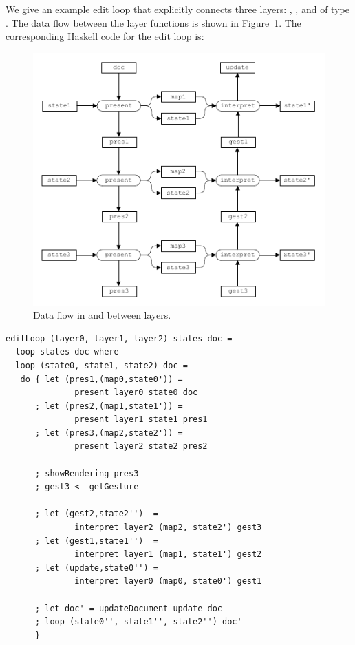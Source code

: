 \documentclass[preprint,natbib]{sigplanconf}
\begin{document}
We give an example edit loop that explicitly connects three layers: , , and  of type . The data flow between the layer functions is shown in Figure~\ref{explicit}. The corresponding Haskell code for the edit loop is:



\begin{figure}
\includegraphics[width=\columnwidth]{images/LayersDataFlow}
\caption{Data flow in and between layers.} \label{explicit} 
\end{figure}

\begin{small}
\begin{verbatim}
editLoop (layer0, layer1, layer2) states doc = 
  loop states doc where
  loop (state0, state1, state2) doc = 
   do { let (pres1,(map0,state0')) = 
              present layer0 state0 doc
      ; let (pres2,(map1,state1')) = 
              present layer1 state1 pres1
      ; let (pres3,(map2,state2')) = 
              present layer2 state2 pres2

      ; showRendering pres3
      ; gest3 <- getGesture

      ; let (gest2,state2'')  = 
              interpret layer2 (map2, state2') gest3
      ; let (gest1,state1'')  =
              interpret layer1 (map1, state1') gest2
      ; let (update,state0'') = 
              interpret layer0 (map0, state0') gest1
      
      ; let doc' = updateDocument update doc
      ; loop (state0'', state1'', state2'') doc'
      }
\end{verbatim}
\end{small}
\end{document}
